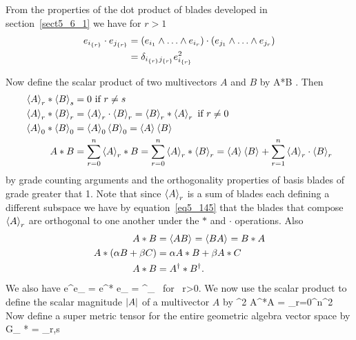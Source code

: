 From the properties of the dot product of blades developed in section~\ref{sect5_6_1} we have for $r>1$
\begin{align}
	e_{\ndx{i}{r}}\cdot e_{\ndx{j}{r}} &= \paren{e_{i_{1}}\W\dots\W e_{i_{r}}}\cdot\paren{e_{j_{1}}\W\dots\W e_{j_{r}}} \\
	                                   &= \delta_{\ndx{i}{r}\ndx{j}{r}}e_{\ndx{i}{r}}^{2}
\end{align}

Now define the scalar product of two multivectors $A$ and $B$ by
\be
	A*B \equiv {}.
\ee
Then
\begin{align}
	\left \langle {A} \right \rangle_{r}*\left \langle {B} \right \rangle_{s} &= 0 \mbox{ if } r \ne s \\
	\left \langle {A} \right \rangle_{r}*\left \langle {B} \right \rangle_{r} &= \left \langle {A} \right \rangle_{r}\cdot\left \langle {B} \right \rangle_{r} = \left \langle {B} \right \rangle_{r}*\left \langle {A} \right \rangle_{r}  \mbox{ if } r \ne 0 \\
	\left \langle {A} \right \rangle_{0}*\left \langle {B} \right \rangle_{0} &= \left \langle {A} \right \rangle_{0}\left \langle {B} \right \rangle_{0} = \left \langle {A} \right \rangle_{}\left \langle {B} \right \rangle_{} \\
	A*B &= \sum_{r=0}^{n}\left \langle {A} \right \rangle_{r}*B =  \sum_{r=0}^{n}\left \langle {A} \right \rangle_{r}*\left \langle {B} \right \rangle_{r} = \left \langle {A} \right \rangle_{}\left \langle {B} \right \rangle_{}+\sum_{r=1}^{n}\left \langle {A} \right \rangle_{r}\cdot\left \langle {B} \right \rangle_{r} 
\end{align}
by grade counting arguments and the orthogonality properties of basis blades of grade greater that 1.  Note that since 
$\left \langle {A} \right \rangle_{r}$ is a sum of blades each defining a different subspace we have by equation~\ref{eq5_145} that the blades that
 compose $\left \langle {A} \right \rangle_{r}$ are orthogonal to one another under the $*$ and $\cdot$ operations.  Also
\begin{align}
	A*B &= \left \langle {AB} \right \rangle_{} = \left \langle {BA} \right \rangle_{} = B*A \label{eq6_15}\\
	A*\left ( {\alpha B+\beta C} \right ) &= \alpha A*B+\beta A*C \\
	A*B &= A^{\dagger}*B^{\dagger}. \label{eq6_17}
\end{align}
We also have
\be
	e^{}\cdot e_{} = e^{}* e_{} = \delta^{}_{} \mbox{ for } r>0.
\ee
We now use the scalar product to define the scalar magnitude $\left | {A} \right |$ of a multivector $A$ by
\be
	^{2} \equiv A^{\R}*A = \sum_{r=0}^{n}^{2}
\ee
Now define a super metric tensor for the entire geometric algebra vector space by
\be
	G_{} \equiv {}* = \delta_{r,s}
